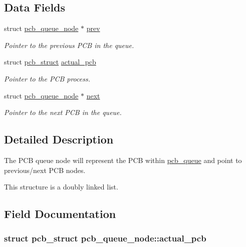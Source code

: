 \subsection*{Data Fields}
\begin{DoxyCompactItemize}
\item 
struct \hyperlink{structpcb__queue__node}{pcb\+\_\+queue\+\_\+node} $\ast$ \hyperlink{structpcb__queue__node_aff49de430038d879a5a58105aa1544d5}{prev}
\begin{DoxyCompactList}\small\item\em Pointer to the previous P\+CB in the queue. \end{DoxyCompactList}\item 
struct \hyperlink{structpcb__struct}{pcb\+\_\+struct} \hyperlink{structpcb__queue__node_aec85184e42b89d83290f46d292a9c2df}{actual\+\_\+pcb}
\begin{DoxyCompactList}\small\item\em Pointer to the P\+CB process. \end{DoxyCompactList}\item 
struct \hyperlink{structpcb__queue__node}{pcb\+\_\+queue\+\_\+node} $\ast$ \hyperlink{structpcb__queue__node_a6634871cb99f4f53fed51e9b51f6852c}{next}
\begin{DoxyCompactList}\small\item\em Pointer to the next P\+CB in the queue. \end{DoxyCompactList}\end{DoxyCompactItemize}


\subsection{Detailed Description}
The P\+CB queue node will represent the P\+CB within \hyperlink{structpcb__queue}{pcb\+\_\+queue} and point to previous/next P\+CB nodes. 

This structure is a doubly linked list. 

\subsection{Field Documentation}
\subsubsection[{\texorpdfstring{actual\+\_\+pcb}{actual_pcb}}]{\setlength{\rightskip}{0pt plus 5cm}struct {\bf pcb\+\_\+struct} pcb\+\_\+queue\+\_\+node\+::actual\+\_\+pcb}\hypertarget{structpcb__queue__node_aec85184e42b89d83290f46d292a9c2df}{}\label{structpcb__queue__node_aec85184e42b89d83290f46d292a9c2df}


